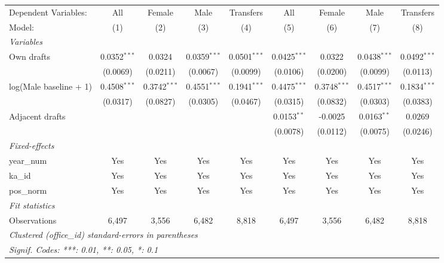\begingroup
\centering
\begin{tabular}{lcccccccc}
   \tabularnewline \midrule \midrule
   Dependent Variables:   & All            & Female         & Male           & Transfers      & All            & Female         & Male           & Transfers\\  
   Model:                 & (1)            & (2)            & (3)            & (4)            & (5)            & (6)            & (7)            & (8)\\  
   \midrule
   \emph{Variables}\\
   Own drafts             & 0.0352$^{***}$ & 0.0324         & 0.0359$^{***}$ & 0.0501$^{***}$ & 0.0425$^{***}$ & 0.0322         & 0.0438$^{***}$ & 0.0492$^{***}$\\   
                          & (0.0069)       & (0.0211)       & (0.0067)       & (0.0099)       & (0.0106)       & (0.0200)       & (0.0099)       & (0.0113)\\   
   log(Male baseline + 1) & 0.4508$^{***}$ & 0.3742$^{***}$ & 0.4551$^{***}$ & 0.1941$^{***}$ & 0.4475$^{***}$ & 0.3748$^{***}$ & 0.4517$^{***}$ & 0.1834$^{***}$\\   
                          & (0.0317)       & (0.0827)       & (0.0305)       & (0.0467)       & (0.0315)       & (0.0832)       & (0.0303)       & (0.0383)\\   
   Adjacent drafts        &                &                &                &                & 0.0153$^{**}$  & -0.0025        & 0.0163$^{**}$  & 0.0269\\   
                          &                &                &                &                & (0.0078)       & (0.0112)       & (0.0075)       & (0.0246)\\   
   \midrule
   \emph{Fixed-effects}\\
   year\_num              & Yes            & Yes            & Yes            & Yes            & Yes            & Yes            & Yes            & Yes\\  
   ka\_id                 & Yes            & Yes            & Yes            & Yes            & Yes            & Yes            & Yes            & Yes\\  
   pos\_norm              & Yes            & Yes            & Yes            & Yes            & Yes            & Yes            & Yes            & Yes\\  
   \midrule
   \emph{Fit statistics}\\
   Observations           & 6,497          & 3,556          & 6,482          & 8,818          & 6,497          & 3,556          & 6,482          & 8,818\\  
   \midrule \midrule
   \multicolumn{9}{l}{\emph{Clustered (office\_id) standard-errors in parentheses}}\\
   \multicolumn{9}{l}{\emph{Signif. Codes: ***: 0.01, **: 0.05, *: 0.1}}\\
\end{tabular}
\par\endgroup
